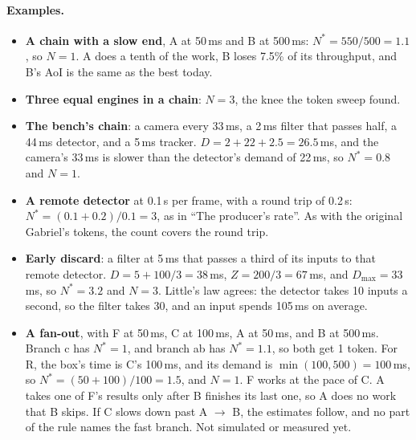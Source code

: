 \documentclass[11pt]{article}
\begin{document}
\paragraph{Examples.}
\begin{itemize}[nosep]
  \item \textbf{A chain with a slow end}, A at 50\,ms and B at 500\,ms:
        $N^* = 550/500 = 1.1$, so $N = 1$. A does a tenth of the work, B
        loses 7.5\% of its throughput, and B's AoI is the same as the best
        today.
  \item \textbf{Three equal engines in a chain}: $N = 3$, the knee the token
        sweep found.
  \item \textbf{The bench's chain}: a camera every 33\,ms, a 2\,ms filter
        that passes half, a 44\,ms detector, and a 5\,ms tracker. $D = 2 +
        22 + 2.5 = 26.5$\,ms, and the camera's 33\,ms is slower than the
        detector's demand of 22\,ms, so $N^* = 0.8$ and $N = 1$.
  \item \textbf{A remote detector} at 0.1\,s per frame, with a round trip of
        0.2\,s: $N^* = (0.1 + 0.2)/0.1 = 3$, as in ``The producer's rate''.
        As with the original Gabriel's tokens, the count covers the round
        trip.
  \item \textbf{Early discard}: a filter at 5\,ms that passes a third of its
        inputs to that remote detector. $D = 5 + 100/3 = 38$\,ms, $Z =
        200/3 = 67$\,ms, and $D_{\max} = 33$\,ms, so $N^* = 3.2$ and $N =
        3$. Little's law agrees: the detector takes 10 inputs a second, so
        the filter takes 30, and an input spends 105\,ms on average.
  \item \textbf{A fan-out}, with F at 50\,ms, C at 100\,ms, A at 50\,ms,
        and B at 500\,ms. Branch c has $N^* = 1$, and branch ab has $N^* =
        1.1$, so both get 1 token. For R, the box's time is C's 100\,ms, and
        its demand is $\min(100, 500) = 100$\,ms, so $N^* = (50 + 100)/100 =
        1.5$, and $N = 1$. F works at the pace of C. A takes one of F's
        results only after B finishes its last one, so A does no work that B
        skips. If C slows down past A $\to$ B, the estimates follow, and no
        part of the rule names the fast branch. Not simulated or measured
        yet.
\end{itemize}
\end{document}
